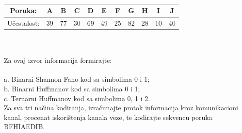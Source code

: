 \documentclass[12pt]{article}
\begin{document}
\begin{enumerate}
\\
\begin{tabular}{|c|c|c|c|c|c|c|c|c|c|c|}
\hline
Poruka:     & A  & B  & C  & D  & E  & F  & G  & H  & I  & J  \\ \hline
Učestalost: & 39 & 77 & 30 & 69 & 49 & 25 & 82 & 28 & 10 & 40 \\ \hline
\end{tabular}
\\
\\
Za ovaj izvor informacija formirajte: \\
\\
a. Binarni Shannon-Fano kod sa simbolima 0 i 1; \\
b. Binarni Huffmanov kod sa simbolima 0 i 1; \\
c. Ternarni Huffmanov kod sa simbolima 0, 1 i 2. \\

Za sva tri načina kodiranja, izračunajte protok informacija kroz komunikacioni kanal, procenat iskorištenja kanala veze, te kodirajte sekvencu poruka BFHIAEDIB.


\end{enumerate}
\end{document}
